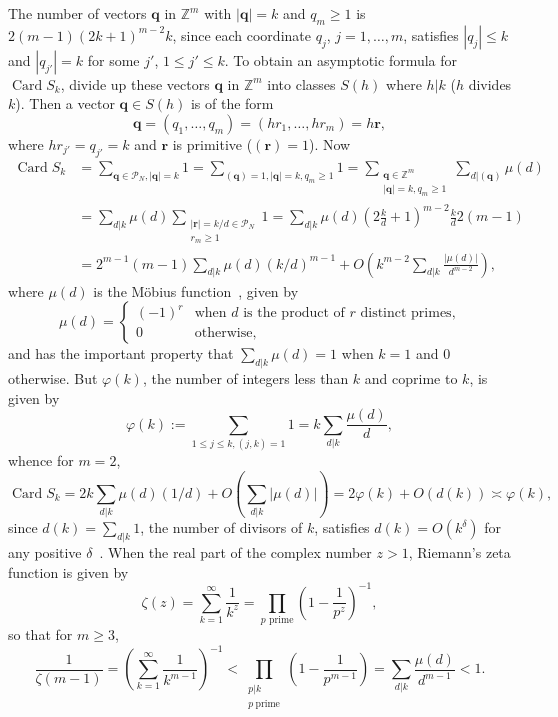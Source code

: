 \documentclass[reqno]{amsart}
\renewcommand{\ge}{\geqslant}
\renewcommand{\le}{\leqslant}
\newcommand{\Z}{{\mathbb{Z}}}
\newcommand{\0}{{\mathbf{0}}}
\newcommand{\q}{{\mathbf{q}}}
\newcommand{\rb}{\mathbf{r}}
\newcommand{\cP}{\mathcal{P}}
\newcommand{\vphi}{\varphi}
\DeclareMathOperator{\Card}{Card}
\begin{document}
The number of vectors $\q$ in $\Z^{m}$ with $|\q| = k$ and $q_m \ge 1$
is $2(m-1)(2k+1)^{m-2}k$, since each coordinate $q_j$, $j =
1,\dots,m$, satisfies $|q_j| \le k$ and $|q_{j'}| = k$ for some $j'$,
$1\le j' \le k$.  To obtain an asymptotic formula for $\Card S_k$,
divide up these vectors $\q$ in $\Z^m$ into classes $S(h)$ where $
h|k$ ($h$ divides $k$).  Then a vector $\q \in S(h)$ is of the form
$$
\q = (q_1,\dots,q_m) = (hr_1,\dots,hr_m) = h\rb,
$$
where $hr_{j'}  = q_{j'} = k$ and $\rb$ is primitive ($(\rb)=1$).  
Now
 \begin{align*}
   \Card S_k &  = \sum_{\q\in \cP_N, |\q|=k} 1 
= \sum_{(\q)=1, |\q| = k, q_m\ge 1} 1 
= \sum_{\substack{\q\in \Z^m\\ |\q|=k, q_m\ge1}} \sum_{d|(\q)}
   \mu(d) \\
&   =  \sum_{d|k}\mu(d) \sum_{\substack{|\rb|=k/d\in \cP_N\\
       r_m \ge 1}} 1 
 = \sum_{d|k}\mu(d)
   \left(2\frac{k}{d}+1\right)^{m-2}\frac{k}{d}2(m-1) \\ & =
   2^{m-1}(m-1) \sum_{d|k} \mu(d)(k/d)^{m-1} + O\left(k^{m-2}
     \sum_{d|k}\frac{|\mu(d)|}{d^{m-2}} \right),
\end{align*}
where  $\mu(d)$ is the M\"obius function~\cite[p 234]{HW}, given by
$$
\mu(d) = \begin{cases} (-1)^r &\text{when $d$ is the product of $r$ distinct 
primes,}\\
                 0     &\text{otherwise}, 
\end{cases}
$$
and has the important property that $\sum_{d|k}\mu(d)=1$ when $k=1$
and $0$ otherwise.  
 But $\vphi(k)$, the number of integers less than $k$ and coprime to
 $k$, is given by
$$
\vphi(k) := \sum_{1\le j\le k, (j,k)=1}1 =k \sum_{d|k} {\frac{\mu(d)}{d}},
$$
whence for $m=2$, 
\begin{equation*}
\Card S_k = 2 k\sum_{d|k} \mu(d)(1/d)
+ O\left(\sum_{d|k}|\mu(d)| \right) = 2 \vphi(k) + O(d(k))\asymp \vphi(k),
\end{equation*}
since $d(k)= \sum_{d|k} 1$, the number of divisors of $k$, satisfies
$d(k) = O(k^{\delta}) $ for any positive $\delta$~\cite[Theorem
315]{HW}.
 When the real part of the complex number $z>1$, Riemann's zeta
function is given by
$$
\zeta(z) = \sum_{k=1}^{\infty} \frac1{k^z}
 = \prod_{p{\text{ prime}}}\left(1-\frac1{p^{z}}\right)^{-1},
$$ 
so that for $m\ge 3$,
\begin{equation*}
  \frac1{\zeta(m-1)} =
  \left(\sum_{k=1}^{\infty} \frac1{k^{m-1}}\right)^{-1} 
< \prod_{{\substack{p|k\\ p\ \text{prime}}}}
  \left(1-\frac1{p^{m-1}}\right) = \sum_{d|k} \frac{\mu(d)}{d^{m-1}} <  1.
\end{equation*}
\end{document}
